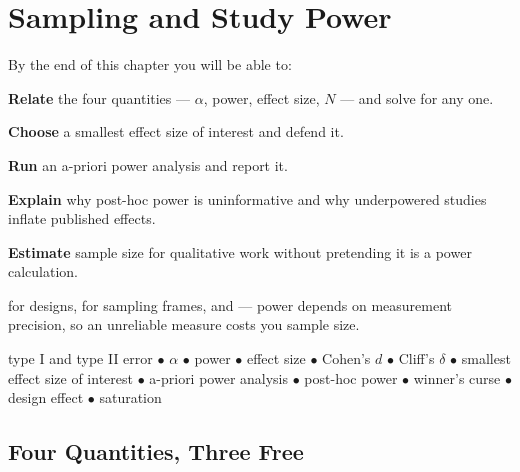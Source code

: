 \chapter{Sampling and Study Power}\label{ch:sampling}

\begin{outcomes}
By the end of this chapter you will be able to:
\begin{tight}
  \item \textbf{Relate} the four quantities --- $\alpha$, power, effect size,
    $N$ --- and solve for any one.
  \item \textbf{Choose} a smallest effect size of interest and defend it.
  \item \textbf{Run} an a-priori power analysis and report it.
  \item \textbf{Explain} why post-hoc power is uninformative and why
    underpowered studies inflate published effects.
  \item \textbf{Estimate} sample size for qualitative work without pretending
    it is a power calculation.
\end{tight}
\end{outcomes}

\begin{prereq}
 for designs,  for sampling frames, and
 --- power depends on measurement precision, so an unreliable
measure costs you sample size.
\end{prereq}

\begin{keyterms}
type I and type II error $\bullet$ $\alpha$ $\bullet$ power $\bullet$ effect
size $\bullet$ Cohen's $d$ $\bullet$ Cliff's $\delta$ $\bullet$ smallest effect
size of interest $\bullet$ a-priori power analysis $\bullet$ post-hoc power
$\bullet$ winner's curse $\bullet$ design effect $\bullet$ saturation
\end{keyterms}

\section{Four Quantities, Three Free}

